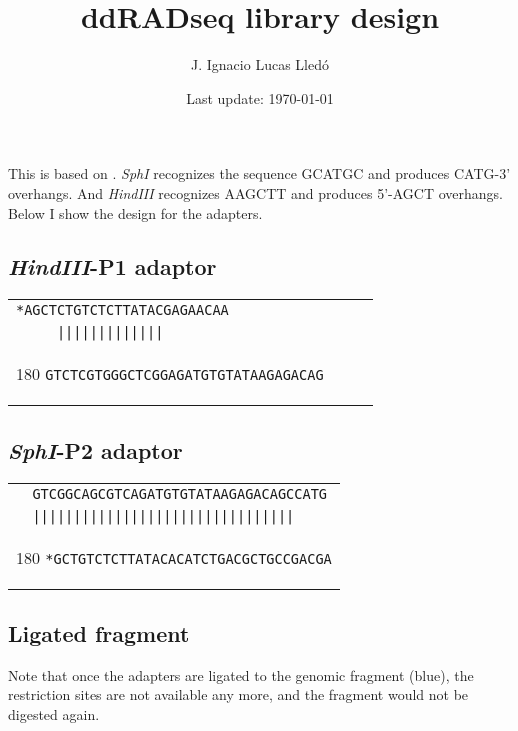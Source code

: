 \documentclass[a4paper,12pt]{article}
\author{J. Ignacio Lucas Lledó}
\title{ddRADseq library design}
\date{Last update: \today}
\begin{document}
\maketitle
\begin{flushleft}
This is based on \citet{Salas-Lizana2018}. \emph{SphI} recognizes the sequence \textsf{GCATGC} and produces \textsf{CATG}-3' overhangs. And \emph{HindIII} recognizes \textsf{AAGCTT} and produces 5'-\textsf{AGCT} overhangs. Below I show the design for the adapters.

\subsection*{\emph{HindIII}-P1 adaptor}
\begin{tabular}{l}
\verb+*AGCTCTGTCTCTTATACGAGAACAA+\\
\verb+     |||||||||||||+\\[-8pt]
   \begin{turn}{180}
   \verb+GTCTCGTGGGCTCGGAGATGTGTATAAGAGACAG     +
   \end{turn}
\\
\end{tabular}
\vspace*{0.3cm}

\subsection*{\emph{SphI}-P2 adaptor}

\begin{tabular}{l}
\verb+  GTCGGCAGCGTCAGATGTGTATAAGAGACAGCCATG+\\
\verb+  ||||||||||||||||||||||||||||||||+\\[-8pt]
   \begin{turn}{180}
   \verb+*GCTGTCTCTTATACACATCTGACGCTGCCGACGA+
   \end{turn}
\\
\end{tabular}
\vspace*{0.3cm}

\subsection*{Ligated fragment}
Note that once the adapters are ligated to the genomic fragment (blue), the restriction sites are not available any more, and the fragment would not be digested again. 


\end{flushleft}
\end{document}
